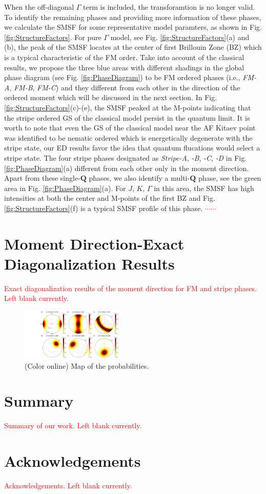 \documentclass[aps,prb,reprint,amsfonts,amsmath,amssymb,showpacs,groupedaddress,superscriptaddress]{revtex4-1}
\begin{document}
When the off-diagonal $\Gamma$ term is included, the transforamtion is no longer valid. To identify the remaining phases and providing more information of these phases, we calculate the SMSF for some representative model paramters, as shown in Fig. \ref{fig:StructureFactors}. For pure $\Gamma$ model, see Fig. \ref{fig:StructureFactors}(a) and (b), the peak of the SMSF locates at the center of first Brillouin Zone (BZ) which is a typical characteristic of the FM order. Take into account of the classical results, we propose the three blue areas with different shadings in the global phase diagram (see Fig. \ref{fig:PhaseDiagram}) to be FM ordered phases (i.e., \emph{FM-A}, \emph{FM-B}, \emph{FM-C}) and they different from each other in the direction of the ordered moment which will be discussed in the next section. In Fig. \ref{fig:StructureFactors}(c)-(e), the SMSF peaked at the M-points indicating that the stripe ordered GS of the classical model persist in the quantum limit. It is worth to note that even the GS of the classical model near the AF Kitaev point was identified to be nematic ordered which is energetically degenerate with the stripe state, our ED results favor the idea that quantum flucations would select a stripe state. The four stripe phases designated as \emph{Stripe-A}, \emph{-B}, \emph{-C}, \emph{-D} in Fig. \ref{fig:PhaseDiagram}(a) different from each other only in the moment direction. Apart from these single-$\mathbf{Q}$ phases, we also identify a multi-$\mathbf{Q}$ phase, see the green area in Fig. \ref{fig:PhaseDiagram}(a). For $J$, $K$, $\Gamma$ in this area, the SMSF has high intensities at both the center and M-points of the first BZ and Fig. \ref{fig:StructureFactors}(f) is a typical SMSF profile of this phase. \textcolor{red}{$\cdots \cdots$}

\section{Moment Direction-Exact Diagonalization Results}
\textcolor{red}{Exact diagonalization results of the moment direction for FM and stripe phases. Left blank currently.}

\begin{figure}
    \includegraphics[width=0.45\textwidth]{Fig4.pdf}
    \caption{(Color online) Map of the probabilities.}
     \label{fig:Proabilities}
\end{figure}



\section{Summary}
\textcolor{red}{Summary of our work. Left blank currently.}

\section{Acknowledgements}
\textcolor{red}{Acknowledgements. Left blank currently.}


\end{document}
